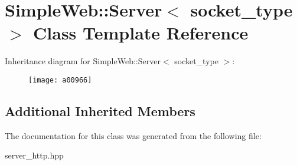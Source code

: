\hypertarget{a00966}{}\section{Simple\+Web\+:\+:Server$<$ socket\+\_\+type $>$ Class Template Reference}
\label{a00966}
Inheritance diagram for Simple\+Web\+:\+:Server$<$ socket\+\_\+type $>$\+:\begin{figure}[H]
\begin{center}
\leavevmode
\texttt{[image: a00966]}
\end{center}
\end{figure}
\subsection*{Additional Inherited Members}


The documentation for this class was generated from the following file\+:\begin{DoxyCompactItemize}
\item 
server\+\_\+http.\+hpp\end{DoxyCompactItemize}

